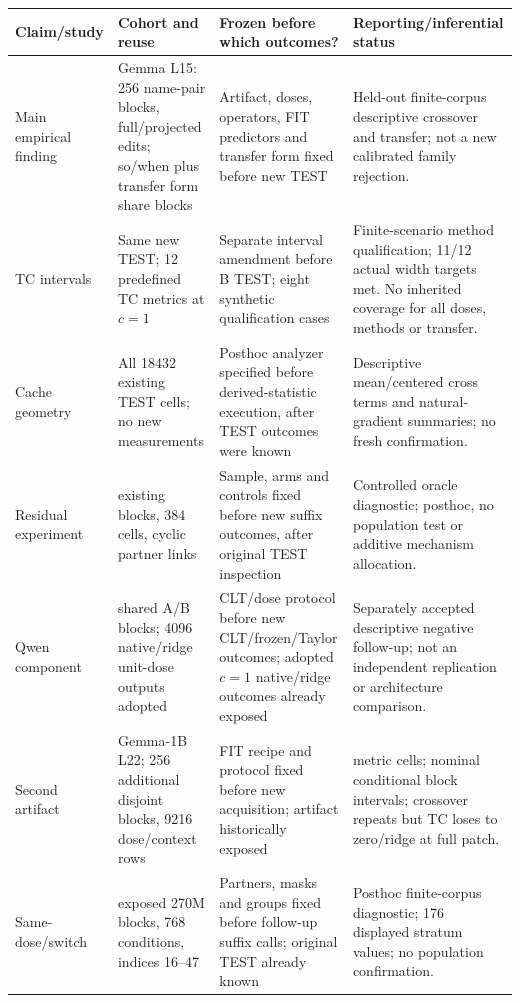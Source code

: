\begin{table}[ht]\centering\scriptsize
\setlength{\tabcolsep}{4pt}
\begin{tabular}{>{\raggedright\arraybackslash}p{}>{\raggedright\arraybackslash}p{}>{\raggedright\arraybackslash}p{}>{\raggedright\arraybackslash}p{}}\toprule
Claim/study & Cohort and reuse & Frozen before which outcomes? & Reporting/inferential status\\\midrule
Main empirical finding & Gemma L15: 256 name-pair blocks, full/projected edits; so/when plus transfer form share blocks & Artifact, doses, operators, FIT predictors and transfer form fixed before new TEST & Held-out finite-corpus descriptive crossover and transfer; not a new calibrated family rejection.\\[3pt]
TC intervals & Same new TEST; 12 predefined TC metrics at $c=1$ & Separate interval amendment before B TEST; eight synthetic qualification cases & Finite-scenario method qualification; 11/12 actual width targets met. No inherited coverage for all doses, methods or transfer.\\[3pt]
Cache geometry & All 18432 existing TEST cells; no new measurements & Posthoc analyzer specified before derived-statistic execution, after TEST outcomes were known & Descriptive mean/centered cross terms and natural-gradient summaries; no fresh confirmation.\\[3pt]
Residual experiment & 16 existing blocks, 384 cells, cyclic partner links & Sample, arms and controls fixed before new suffix outcomes, after original TEST inspection & Controlled oracle diagnostic; posthoc, no population test or additive mechanism allocation.\\[3pt]
Qwen component & 256 shared A/B blocks; 4096 native/ridge unit-dose outputs adopted & CLT/dose protocol before new CLT/frozen/Taylor outcomes; adopted $c=1$ native/ridge outcomes already exposed & Separately accepted descriptive negative follow-up; not an independent replication or architecture comparison.\\[3pt]
Second artifact & Gemma-1B L22; 256 additional disjoint blocks, 9216 dose/context rows & FIT recipe and protocol fixed before new acquisition; artifact historically exposed & 144 metric cells; nominal conditional block intervals; crossover repeats but TC loses to zero/ridge at full patch.\\[3pt]
Same-dose/switch & 32 exposed 270M blocks, 768 conditions, indices 16--47 & Partners, masks and groups fixed before follow-up suffix calls; original TEST already known & Posthoc finite-corpus diagnostic; 176 displayed stratum values; no population confirmation.\\[3pt]

\end{tabular}
\end{table}
